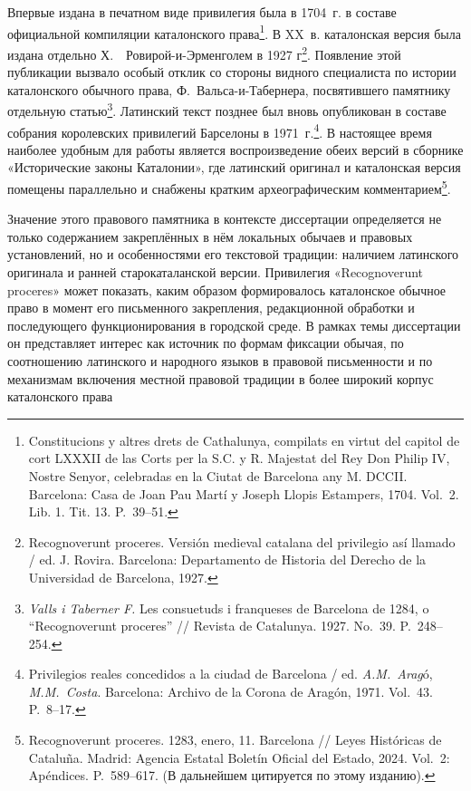Впервые издана в печатном виде привилегия была в 1704~г. в составе официальной компиляции каталонского права\footnote{Constitucions y altres drets de Cathalunya, compilats en virtut del capitol de cort LXXXII de las Corts per la S.C. y R. Majestat del Rey Don Philip IV, Nostre Senyor, celebradas en la Ciutat de Barcelona any M. DCCII. Barcelona: Casa de Joan Pau Martí y Joseph Llopis Estampers, 1704. Vol.~2. Lib. 1. Tit. 13. P.~39--51.}. В XX~в. каталонская версия была издана отдельно Х.~~Ровирой-и-Эрменголем в 1927 г\footnote{Recognoverunt proceres. Versión medieval catalana del privilegio así llamado / ed. J. Rovira. Barcelona: Departamento de Historia del Derecho de la Universidad de Barcelona, 1927.}. Появление этой публикации вызвало особый отклик со стороны видного специалиста по истории каталонского обычного права, Ф.~Вальса-и-Табернера, посвятившего памятнику отдельную статью\footnote{\emph{Valls i Taberner F. }Les consuetuds i franqueses de Barcelona de 1284, o “Recognoverunt proceres” // Revista de Catalunya. 1927. No.~39. P.~248--254.}. Латинский текст позднее был вновь опубликован в составе собрания королевских привилегий Барселоны в 1971~г.\footnote{Privilegios reales concedidos a la ciudad de Barcelona / ed. \emph{A.M.~Arag}ó, \emph{M.M.~Costa}. Barcelona: Archivo de la Corona de Aragón, 1971. Vol.~43. P.~8--17.}. В настоящее время наиболее удобным для работы является воспроизведение обеих версий в сборнике «Исторические законы Каталонии», где латинский оригинал и каталонская версия помещены параллельно и снабжены кратким археографическим комментарием\footnote{Recognoverunt proceres. 1283, enero, 11. Barcelona // Leyes Históricas de Cataluña. Madrid: Agencia Estatal Boletín Oficial del Estado, 2024. Vol.~2: Apéndices. P.~589--617. (В дальнейшем цитируется по этому изданию).}.

Значение этого правового памятника в контексте диссертации определяется не только содержанием закреплённых в нём локальных обычаев и правовых установлений, но и особенностями его текстовой традиции: наличием латинского оригинала и ранней старокаталанской версии. Привилегия «Recognoverunt proceres» может показать, каким образом формировалось каталонское обычное право в момент его письменного закрепления, редакционной обработки и последующего функционирования в городской среде. В рамках темы диссертации он представляет интерес как источник по формам фиксации обычая, по соотношению латинского и народного языков в правовой письменности и по механизмам включения местной правовой традиции в более широкий корпус каталонского права

